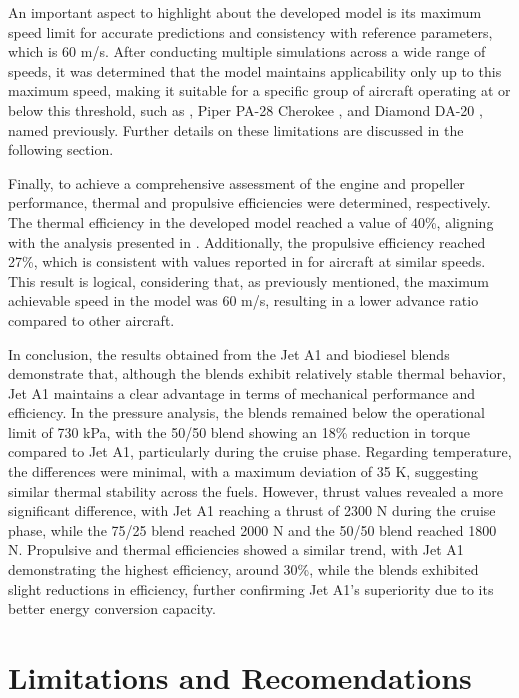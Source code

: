 \documentclass{Format}
\begin{document}
An important aspect to highlight about the developed model is its maximum speed limit for accurate predictions and consistency with reference parameters, which is 60 m/s. After conducting multiple simulations across a wide range of speeds, it was determined that the model maintains applicability only up to this maximum speed, making it suitable for a specific group of aircraft operating at or below this threshold, such as \cite{cessna_skyhawk_2024}, Piper PA-28 Cherokee \cite{piper_cherokee_2021}, and Diamond DA-20 \cite{diamond_da20_2024}, named previously. Further details on these limitations are discussed in the following section.

Finally, to achieve a comprehensive assessment of the engine and propeller performance, thermal and propulsive efficiencies were determined, respectively. The thermal efficiency in the developed model reached a value of 40\%, aligning with the analysis presented in \cite{pulido2008conversión}. Additionally, the propulsive efficiency reached 27\%, which is consistent with values reported in \cite{book:96630002} for aircraft at similar speeds. This result is logical, considering that, as previously mentioned, the maximum achievable speed in the model was 60 m/s, resulting in a lower advance ratio compared to other aircraft.
\vspace{5pt}

In conclusion, the results obtained from the Jet A1 and biodiesel blends demonstrate that, although the blends exhibit relatively stable thermal behavior, Jet A1 maintains a clear advantage in terms of mechanical performance and efficiency. In the pressure analysis, the blends remained below the operational limit of 730 kPa, with the 50/50 blend showing an 18\% reduction in torque compared to Jet A1, particularly during the cruise phase. Regarding temperature, the differences were minimal, with a maximum deviation of 35 K, suggesting similar thermal stability across the fuels. However, thrust values revealed a more significant difference, with Jet A1 reaching a thrust of 2300 N during the cruise phase, while the 75/25 blend reached 2000 N and the 50/50 blend reached 1800 N. Propulsive and thermal efficiencies showed a similar trend, with Jet A1 demonstrating the highest efficiency, around 30\%, while the blends exhibited slight reductions in efficiency, further confirming Jet A1’s superiority due to its better energy conversion capacity.

\section{Limitations and Recomendations}
\end{document}
